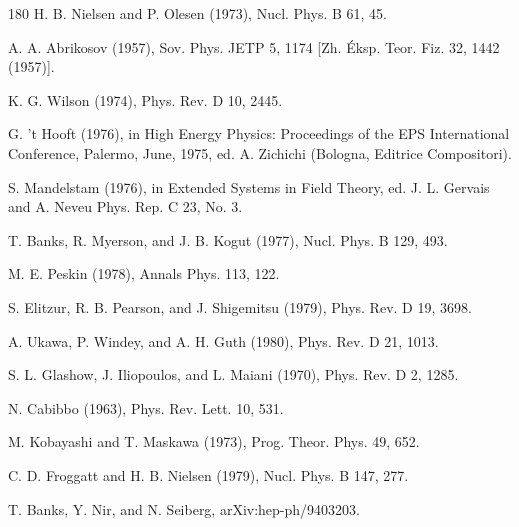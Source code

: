 \begin{thebibliography}{180}
 H. B. Nielsen and P. Olesen (1973), Nucl. Phys. B 61, 45.

 A. A. Abrikosov (1957), Sov. Phys. JETP 5, 1174 [Zh. Éksp. Teor. Fiz. 32, 1442 (1957)].

 K. G. Wilson (1974), Phys. Rev. D 10, 2445.

 G. 't Hooft (1976), in High Energy Physics: Proceedings of the EPS International Conference, Palermo, June, 1975, ed. A. Zichichi (Bologna, Editrice Compositori).

 S. Mandelstam (1976), in Extended Systems in Field Theory, ed. J. L. Gervais and A. Neveu Phys. Rep. C 23, No. 3.

 T. Banks, R. Myerson, and J. B. Kogut (1977), Nucl. Phys. B 129, 493.

 M. E. Peskin (1978), Annals Phys. 113, 122.

 S. Elitzur, R. B. Pearson, and J. Shigemitsu (1979), Phys. Rev. D 19, 3698.

 A. Ukawa, P. Windey, and A. H. Guth (1980), Phys. Rev. D 21, 1013.

 S. L. Glashow, J. Iliopoulos, and L. Maiani (1970), Phys. Rev. D 2, 1285.

 N. Cabibbo (1963), Phys. Rev. Lett. 10, 531.

 M. Kobayashi and T. Maskawa (1973), Prog. Theor. Phys. 49, 652.

 C. D. Froggatt and H. B. Nielsen (1979), Nucl. Phys. B 147, 277.

 T. Banks, Y. Nir, and N. Seiberg, arXiv:hep-ph/9403203.


\end{thebibliography}
